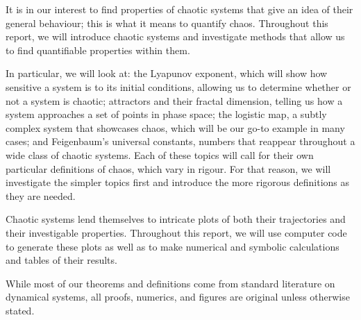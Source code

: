 It is in our interest to find properties of chaotic systems that give an idea of their general behaviour; this is what it means to quantify chaos. Throughout this report, we will introduce chaotic systems and investigate methods that allow us to find quantifiable properties within them. 

In particular, we will look at: the Lyapunov exponent, which will show how sensitive a system is to its initial conditions, allowing us to determine whether or not a system is chaotic; attractors and their fractal dimension, telling us how a system approaches a set of points in phase space; the logistic map, a subtly complex system that showcases chaos, which will be our go-to example in many cases; and Feigenbaum's universal constants, numbers that reappear throughout a wide class of chaotic systems. Each of these topics will call for their own particular definitions of chaos, which vary in rigour. For that reason, we will investigate the simpler topics first and introduce the more rigorous definitions as they are needed.

Chaotic systems lend themselves to intricate plots of both their trajectories and their investigable properties. Throughout this report, we will use computer code to generate these plots as well as to make numerical and symbolic calculations and tables of their results. 

While most of our theorems and definitions come from standard literature on dynamical systems, all proofs, numerics, and figures are original unless otherwise stated.